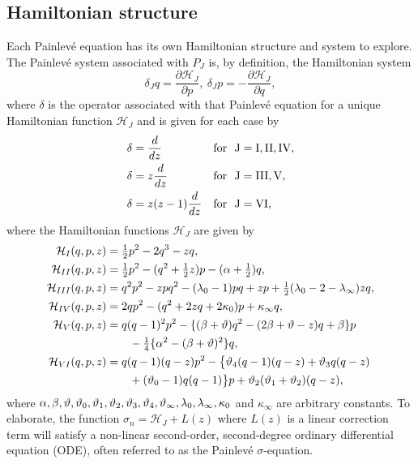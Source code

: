 \documentclass[12pt]{article}
\def\P{Painlev\'e }
\numberwithin{figure}{section}
\numberwithin{equation}{section}
\numberwithin{table}{section}
\begin{document}
\subsection{Hamiltonian structure}
Each \P equation has its own Hamiltonian structure and
system to explore. The \P system associated with $P_J$ is, by definition, the Hamiltonian system
\begin{equation}\label{HE}
\delta_Jq=\frac{\partial \mathcal{H}_J}{\partial p},~\delta_Jp=-\frac{\partial \mathcal{H}_J}{\partial q},
\end{equation}
where $\delta$ is the operator associated with that \P equation for a unique Hamiltonian function $\mathcal{H}_J$ \cite{P:13:47} and is given for each case by
\begin{align}
\delta&=\frac{d}{dz} &&\rm{for~~J=I,II,IV},\\
\delta&=z\frac{d}{dz} &&\rm{for~~J=III,V},\\
\delta&=z(z-1)\frac{d}{dz} &&\rm{for~~J=VI},
\end{align}
where the Hamiltonian functions $\mathcal{H}_J$ are given by
\begin{subequations}
\begin{align}
\mathcal{H}_{I}(q,p,z)&= \tfrac{1}{2}p^2-2q^3-zq,\label{HI}\\
\mathcal{H}_{II}(q,p,z)&= \tfrac{1}{2}p^2-(q^2+\tfrac{1}{2}z)p-(\alpha+\tfrac{1}{2})q,\label{HII}\\
\mathcal{H}_{III}(q,p,z)&= q^2p^2-zpq^2-(\lambda_0-1)pq+zp+\tfrac{1}{2}(\lambda_0-2-\lambda_{\infty})zq,\label{HIII}\\
\mathcal{H}_{IV}(q,p,z)&=2qp^2-(q^2+2zq+2\kappa_0)p+\kappa_{\infty}q,\label{HIV}\\
\mathcal{H}_{V}(q,p,z)&=q(q-1)^2p^2-\{(\beta+\vartheta)q^2-(2\beta+\vartheta-z)q+\beta\}p\nonumber\\
   &\qquad-\tfrac{1}{4}\{\alpha^2-(\beta+\vartheta)^2\}q,\label{HV}\\
\mathcal{H}_{VI}(q,p,z)&=q(q-1)(q-z)p^2-\big\{\vartheta_4(q-1)(q-z)+\vartheta_3q(q-z)\nonumber\\
   &\qquad+(\vartheta_0-1)q(q-1)\big\}p+\vartheta_2(\vartheta_1+\vartheta_2)(q-z),\label{HVI}
\end{align}
\end{subequations}
where $\alpha,\beta,\vartheta,\vartheta_0,\vartheta_1,\vartheta_2,\vartheta_3,\vartheta_4,\vartheta_\infty,\lambda_0,\lambda_\infty,\kappa_0$ and $\kappa_\infty$ are arbitrary constants.
To elaborate, the function $\sigma_n=\mathcal{H}_J+L(z)$ where $L(z)$ is a linear correction term will satisfy a non-linear second-order, second-degree ordinary differential equation (ODE), often referred to as the \P $\sigma$-equation.
\end{document}
